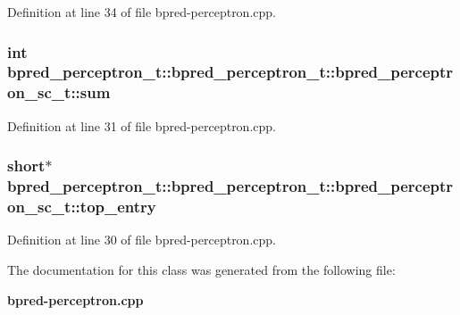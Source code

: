 Definition at line 34 of file bpred-perceptron.cpp.
\subsubsection[{sum}]{\setlength{\rightskip}{0pt plus 5cm}int bpred\_\-perceptron\_\-t::bpred\_\-perceptron\_\-t::bpred\_\-perceptron\_\-sc\_\-t::sum}\label{classbpred__perceptron__t_1_1bpred__perceptron__sc__t_d589c2e22091ed1f90a4c94e11500b38}




Definition at line 31 of file bpred-perceptron.cpp.
\subsubsection[{top\_\-entry}]{\setlength{\rightskip}{0pt plus 5cm}short$\ast$ bpred\_\-perceptron\_\-t::bpred\_\-perceptron\_\-t::bpred\_\-perceptron\_\-sc\_\-t::top\_\-entry}\label{classbpred__perceptron__t_1_1bpred__perceptron__sc__t_2ea57a9d881baebf2b70fd029ec3d594}




Definition at line 30 of file bpred-perceptron.cpp.

The documentation for this class was generated from the following file:\begin{CompactItemize}
\item 
{\bf bpred-perceptron.cpp}\end{CompactItemize}

